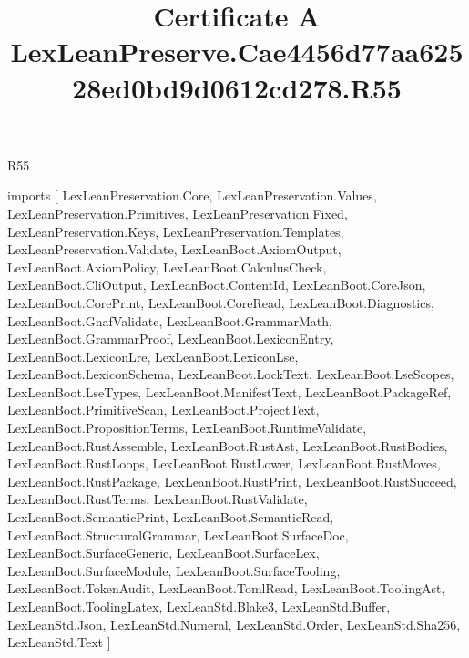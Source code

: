 \begin{lexlean}{R55}
\title{Certificate A LexLeanPreserve.Cae4456d77aa62528ed0bd9d0612cd278.R55}
\begin{coremodule}
imports [
  LexLeanPreservation.Core,
  LexLeanPreservation.Values,
  LexLeanPreservation.Primitives,
  LexLeanPreservation.Fixed,
  LexLeanPreservation.Keys,
  LexLeanPreservation.Templates,
  LexLeanPreservation.Validate,
  LexLeanBoot.AxiomOutput,
  LexLeanBoot.AxiomPolicy,
  LexLeanBoot.CalculusCheck,
  LexLeanBoot.CliOutput,
  LexLeanBoot.ContentId,
  LexLeanBoot.CoreJson,
  LexLeanBoot.CorePrint,
  LexLeanBoot.CoreRead,
  LexLeanBoot.Diagnostics,
  LexLeanBoot.GnafValidate,
  LexLeanBoot.GrammarMath,
  LexLeanBoot.GrammarProof,
  LexLeanBoot.LexiconEntry,
  LexLeanBoot.LexiconLre,
  LexLeanBoot.LexiconLse,
  LexLeanBoot.LexiconSchema,
  LexLeanBoot.LockText,
  LexLeanBoot.LseScopes,
  LexLeanBoot.LseTypes,
  LexLeanBoot.ManifestText,
  LexLeanBoot.PackageRef,
  LexLeanBoot.PrimitiveScan,
  LexLeanBoot.ProjectText,
  LexLeanBoot.PropositionTerms,
  LexLeanBoot.RuntimeValidate,
  LexLeanBoot.RustAssemble,
  LexLeanBoot.RustAst,
  LexLeanBoot.RustBodies,
  LexLeanBoot.RustLoops,
  LexLeanBoot.RustLower,
  LexLeanBoot.RustMoves,
  LexLeanBoot.RustPackage,
  LexLeanBoot.RustPrint,
  LexLeanBoot.RustSucceed,
  LexLeanBoot.RustTerms,
  LexLeanBoot.RustValidate,
  LexLeanBoot.SemanticPrint,
  LexLeanBoot.SemanticRead,
  LexLeanBoot.StructuralGrammar,
  LexLeanBoot.SurfaceDoc,
  LexLeanBoot.SurfaceGeneric,
  LexLeanBoot.SurfaceLex,
  LexLeanBoot.SurfaceModule,
  LexLeanBoot.SurfaceTooling,
  LexLeanBoot.TokenAudit,
  LexLeanBoot.TomlRead,
  LexLeanBoot.ToolingAst,
  LexLeanBoot.ToolingLatex,
  LexLeanStd.Blake3,
  LexLeanStd.Buffer,
  LexLeanStd.Json,
  LexLeanStd.Numeral,
  LexLeanStd.Order,
  LexLeanStd.Sha256,
  LexLeanStd.Text
]


\end{coremodule}
\end{lexlean}
